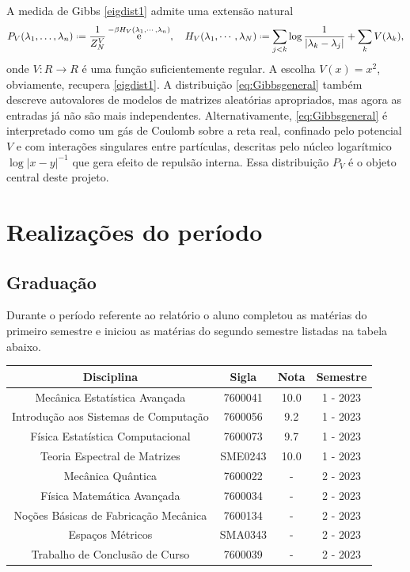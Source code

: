 \documentclass[12pt]{report}
\DeclareMathOperator{\ee}{\rm e}
\newcommand*{\deff}{\mathrel{\vcenter{\baselineskip0.5ex \lineskiplimit0pt
			\hbox{\scriptsize.}\hbox{\scriptsize.}}}%
	=}
\begin{document}
A medida de Gibbs \eqref{eigdist1} admite uma extensão natural
%
\begin{equation}\label{eq:Gibbsgeneral}
	P_V(\lambda_1,\hdots,\lambda_n)\deff \frac{1}{Z^V_N}\ee^{-\beta H_V(\lambda_1,\cdots, \lambda_n)},\quad H_V(\lambda_1,\cdots,\lambda_N)\deff  \sum_{j<k}\log\frac{1}{|\lambda_k - \lambda_j|}+\sum_{k}V(\lambda_k),
\end{equation}
%
onde $V:R\to R$ é uma função suficientemente regular. A escolha $V(x)=x^2$, obviamente, recupera \eqref{eigdist1}. A distribuição \eqref{eq:Gibbsgeneral} também descreve autovalores de modelos de matrizes aleatórias apropriados, mas agora as entradas já não são mais independentes. Alternativamente, \eqref{eq:Gibbsgeneral} é interpretado como um gás de Coulomb sobre a reta real, confinado pelo potencial $V$ e com interações singulares entre partículas, descritas pelo núcleo logarítmico $\log|x-y|^{-1}$ que gera efeito de repulsão interna. Essa distribuição $P_V$ é o objeto central deste projeto.


\chapter{Realizações do período}\label{chp:realizacoes}

\section{Graduação}

Durante o período referente ao relatório o aluno completou as matérias do primeiro semestre e iniciou as matérias do segundo semestre listadas na tabela abaixo.

\hspace{1cm}

\begin{center}
	\begin{tabular}{|c|c|c|c|}
		\hline
		Disciplina & Sigla & Nota & Semestre \\
		\hline
		Mecânica Estatística Avançada & 7600041 & 10.0 & 1 - 2023 \\
		\hline
		Introdução aos Sistemas de Computação & 7600056 & 9.2 & 1 - 2023 \\
		\hline
		Física Estatística Computacional & 7600073 & 9.7 & 1 - 2023 \\
		\hline
		Teoria Espectral de Matrizes & SME0243 & 10.0 & 1 - 2023 \\
		\hline
		Mecânica Quântica & 7600022 & - & 2 - 2023 \\
		\hline
		Física Matemática Avançada & 7600034 & - & 2 - 2023 \\
		\hline
		Noções Básicas de Fabricação Mecânica & 7600134 & - & 2 - 2023 \\
		\hline
		Espaços Métricos & SMA0343 & - & 2 - 2023 \\
		\hline
		Trabalho de Conclusão de Curso & 7600039 & - & 2 - 2023 \\
		\hline
	\end{tabular}
\end{center}
\end{document}
